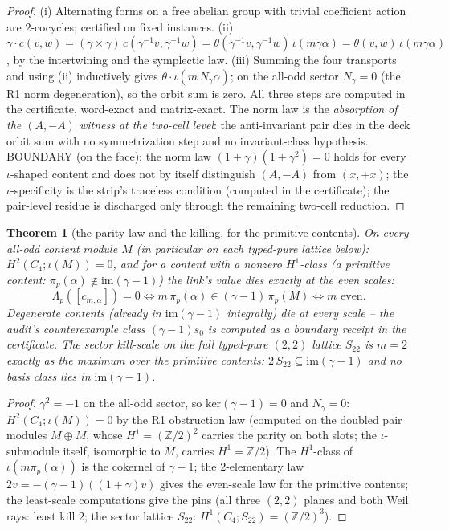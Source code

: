 \documentclass[11pt]{article}
\newtheorem{theorem}{Theorem}
\newcommand{\Z}{\mathbb{Z}}
\newcommand{\im}{\mathrm{im}}
\newcommand{\kerp}{\mathrm{ker}}
\begin{document}
\begin{proof}
(i) Alternating forms on a free abelian group with trivial coefficient action
are $2$-cocycles; certified on fixed instances.
(ii) $\gamma\cdot c(v,w)=(\gamma\times\gamma)\,c(\gamma^{-1}v,\gamma^{-1}w)
=\theta(\gamma^{-1}v,\gamma^{-1}w)\,\iota(m\gamma\alpha)
=\theta(v,w)\,\iota(m\gamma\alpha)$, by the intertwining and the symplectic
law. (iii) Summing the four transports and using (ii) inductively gives
$\theta\cdot\iota(m\,N_\gamma\alpha)$; on the all-odd sector
$N_\gamma=0$ (the R1 norm degeneration), so the orbit sum is zero. All three
steps are computed in the certificate, word-exact and matrix-exact. The
norm law is the \emph{absorption of the $(A,-A)$ witness at the two-cell
level}: the anti-invariant pair dies in the deck orbit sum with no
symmetrization step and no invariant-class hypothesis. BOUNDARY (on the
face): the norm law $(1+\gamma)(1+\gamma^2)=0$ holds for every
$\iota$-shaped content and does not by itself distinguish $(A,-A)$ from
$(x,+x)$; the $\iota$-specificity is the strip's traceless condition
(computed in the certificate); the pair-level residue is discharged only
through the remaining two-cell reduction.
\end{proof}

\begin{theorem}[the parity law and the killing, for the primitive contents]
On every all-odd content module $M$ (in particular on each typed-pure
lattice below): $H^2(C_4;\iota(M))=0$, and for a content with a
\emph{nonzero} $H^1$-class (a primitive content:
$\pi_p(\alpha)\notin\im(\gamma-1)$) the link's value dies exactly at the
even scales:
\[
  \Lambda_p([c_{m,\alpha}])=0
  \iff m\,\pi_p(\alpha)\in(\gamma-1)\,\pi_p(M)
  \iff m \text{ even}.
\]
Degenerate contents (already in $\im(\gamma-1)$ integrally) die at every
scale -- the audit's counterexample class $(\gamma-1)s_0$ is computed as a
boundary receipt in the certificate. The sector kill-scale on the full
typed-pure $(2,2)$ lattice $S_{22}$ is $m=2$ exactly \emph{as the maximum
over the primitive contents}: $2\,S_{22}\subseteq\im(\gamma-1)$ and no
basis class lies in $\im(\gamma-1)$.
\end{theorem}

\begin{proof}
$\gamma^2=-1$ on the all-odd sector, so $\kerp(\gamma-1)=0$ and
$N_\gamma=0$: $H^2(C_4;\iota(M))=0$ by the R1 obstruction law (computed on
the doubled pair modules $M\oplus M$, whose $H^1=(\Z/2)^2$ carries the
parity on both slots; the $\iota$-submodule itself, isomorphic to $M$,
carries $H^1=\Z/2$). The $H^1$-class of $\iota(m\pi_p(\alpha))$ is the
cokernel of $\gamma-1$; the $2$-elementary law
$2v=-(\gamma-1)((1{+}\gamma)v)$ gives the even-scale law for the primitive
contents; the least-scale computations give the pins (all three $(2,2)$
planes and both Weil rays: least kill $2$; the sector lattice $S_{22}$: $H^1(C_4;S_{22})=(\Z/2)^3$).
\end{proof}
\end{document}
